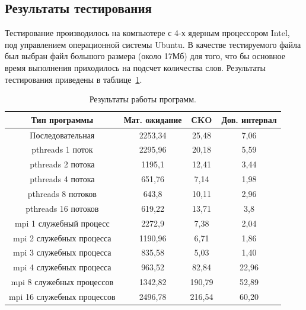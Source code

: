 \documentclass[12pt,a4paper]{report}
\begin{document}
			\subsection{Результаты тестирования}
				Тестирование производилось на компьютере с 4-х ядерным процессором 
				Intel, под управлением операционной системы Ubuntu. В качестве 
				тестируемого файла был выбран файл большого размера 
				(около 17Мб) для того, что бы основное время выполнения приходилось на 
				подсчет количества слов. Результаты тестирования приведены в 
				таблице~\ref{tab:totalTab}.
				\begin{table}[h]
					\caption{\label{tab:totalTab} Результаты работы программ.}
					\begin{center}
						\begin{tabular}{|c|c|c|c|}
							\hline
							\textbf{Тип программы} & \textbf{Мат. ожидание} & \textbf{СKO} & \textbf{Дов. интервал}\\
							\hline
							Последовательная & 2253,34 & 25,48 & 7,06\\
							\hline
							pthreads 1 поток & 2295,96 & 20,18 & 5,59\\
							\hline
							pthreads 2 потока & 1195,1 & 12,41 & 3,44\\
							\hline
							pthreads 4 потока & 651,76 & 7,14 & 1,98\\
							\hline
							pthreads 8 потоков & 643,8 & 10,11 & 2,96\\
							\hline
							pthreads 16 потоков & 619,22 & 13,71 & 3,8\\
							\hline
							mpi 1 служебный процесс & 2272,9 & 7,38 & 2,04\\
							\hline
							mpi 2 служебных процесса & 1190,96 & 6,71 & 1,86\\
							\hline
							mpi 3 служебных процесса & 835,58 & 5,03 & 1,40\\
							\hline
							mpi 4 служебных процесса & 963,52 & 82,84 & 22,96\\
							\hline
							mpi 8 служебных процессов & 1342,82 & 190,79 & 52,89\\
							\hline
							mpi 16 служебных процессов & 2496,78 & 216,54 & 60,20\\
							\hline
						\end{tabular}
					\end{center}
				\end{table}
				
\end{document}

